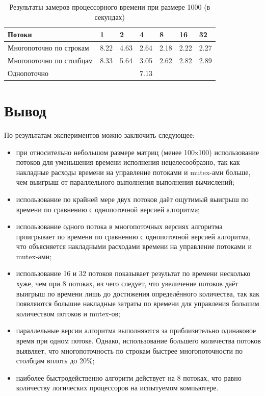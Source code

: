 \documentclass[12pt,a4paper]{report}
\begin{document}
\begin{table}[h!]
\caption{Результаты замеров процессорного времени при размере 1000 (в секундах)}
\label{tabular:timesandtenses}
\begin{center}
\begin{tabular}{ | l | l | l | l | l | l | l | }
\hline
        Потоки                   & 1    & 2    & 4    & 8    & 16   & 32   \\ \hline
        Многопоточно по строкам  & 8.22 & 4.63 & 2.64 & 2.18 & 2.22 & 2.27 \\ \hline
        Многопоточно по столбцам & 8.33 & 5.64 & 3.05 & 2.62 & 2.82 & 2.89 \\ \hline
        Однопоточно              &     \multicolumn{5}{c}{7.13}     &      \\ \hline
\end{tabular}
\end{center}
\end{table}

\newpage
\section{Вывод}

По результатам экспериментов можно заключить следующее:
\begin{itemize}
    \item при относительно небольшом размере матриц (менее 100x100) использование потоков для 
    уменьшения времени исполнения нецелесообразно, так как накладные расходы времени на 
    управление потоками и mutex-ами больше, чем выигрыш от параллельного выполнения выполнения
    вычислений;
    \item использование по крайней мере двух потоков даёт ощутимый выигрыш по времени по 
    сравнению с однопоточной версией алгоритма;
    \item использование одного потока в многопоточных версиях алгоритма проигрывает по времени
    по сравнению с однопоточной версией алгоритма, что объясняется накладными расходами времени
    на управление потоками и mutex-ами;
    \item использование 16 и 32 потоков показывает результат по времени несколько хуже, чем при 
    8 потоках, из чего следует, что увеличение потоков даёт выигрыш по времени лишь до достижения
    определённого количества, так как появляются большие накладные затраты по времени для 
    управления большим количеством потоков и mutex-ов;
    \item параллельные версии алгоритма выполняются за приблизительно одинаковое время при одном
    потоке. Однако, использование большего количества потоков выявляет, что многопоточность по 
    строкам быстрее многопоточности по столбцам вплоть до 20\%;
    \item наиболее быстродейственно алгоритм действует на 8 потоках, что равно количеству 
    логических процессоров на испытуемом компьютере.
\end{itemize}
\end{document}
